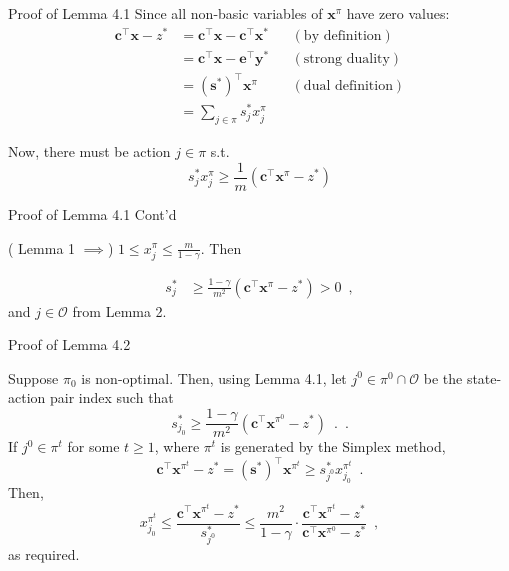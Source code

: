 \documentclass{beamer}
\renewcommand{\vec}[1]{\mathbf{#1}}
\begin{document}

\begin{frame}{Proof of Lemma 4.1}
Since all non-basic variables of $\vec{x}^\pi$ have zero values:
\begin{align*}
\vec{c}^\top\vec{x}-z^* 
&= \vec{c}^\top\vec{x}- \vec{c}^\top\vec{x}^* && (\text{by definition}) \\
%
&= \vec{c}^\top\vec{x}- \vec{e}^\top\vec{y}^* && (\text{strong duality}) \\
%
&= (\vec{s}^*)^\top\vec{x}^\pi &&(\text{dual definition})\\
%
&= \sum_{j\in\pi}s_j^*x_j^\pi &&
\end{align*}

Now, there must be action $j\in\pi$ s.t.
\begin{equation*}
s_j^*x_j^\pi\geq\frac{1}{m}\left(\vec{c}^\top\vec{x}^\pi-z^* \right)
\end{equation*}

\end{frame}



\begin{frame}{Proof of Lemma 4.1 Cont'd}

( Lemma 1 $\implies$) $1\leq x_j^\pi\leq\frac{m}{1-\gamma}$. Then

\begin{align*}
s_j^* &\geq \frac{1-\gamma}{m^2}\left(\vec{c}^\top\vec{x}^\pi-z^* \right)>0\enspace,
\end{align*}
and $j\in\mathcal{O}$ from Lemma 2.

\end{frame}



\begin{frame}{Proof of Lemma 4.2}

Suppose $\pi_0$ is non-optimal. 
Then, using Lemma 4.1, let $j^0\in\pi^0\cap\mathcal{O}$ be the state-action pair index such that 
$$
s_{j_0}^* 
\geq \frac{1-\gamma}{m^2}\left(\vec{c}^\top\vec{x}^{\pi^0}-z^* \right)\enspace.\enspace.$$
If $j^0\in\pi^t$ for some $t\geq1$, where $\pi^t$ is generated by the Simplex method, 
$$\vec{c}^\top\vec{x}^{\pi^t}-z^*
=(\vec{s}^*)^\top\vec{x}^{\pi^t} 
\geq s_{j^0}^*x_{j_0}^{\pi^t}\enspace.$$
Then, 
$$
x_{j_0}^{\pi^t}\leq\frac{\vec{c}^\top\vec{x}^{\pi^t}-z^*}{s_{j^0}^*}
\leq\frac{m^2}{1-\gamma}\cdot\frac{\vec{c}^\top\vec{x}^{\pi^t}-z^*}{\vec{c}^\top\vec{x}^{\pi^0}-z^*}\enspace,
$$
as required.
\end{frame}
\end{document}
